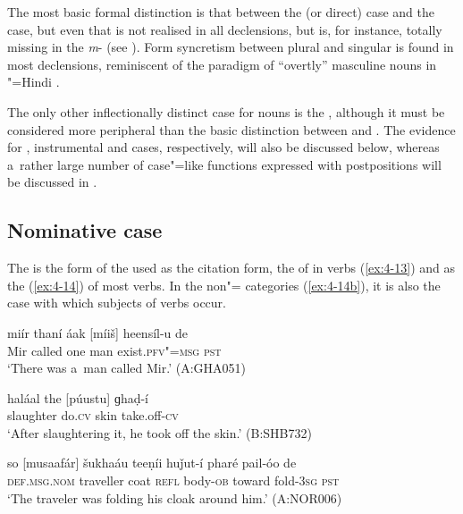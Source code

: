 The most basic formal distinction is that between the  (or direct) case and the  case, but even that is not realised in all declensions, but is, for instance, totally missing in the \textit{m}- (see ). Form syncretism \citep[27]{matthews1991} between  plural and  singular is found in most declensions, reminiscent of the paradigm of ``overtly'' masculine nouns in "=Hindi \citep[1]{schmidt1999}.


The only other inflectionally distinct case for nouns is the , although it must be considered more peripheral than the basic distinction between  and . The evidence for , instrumental and  cases, respectively, will also be discussed below, whereas a~rather large number of case"=like functions expressed with postpositions will be discussed in .


\subsection{Nominative case}
\label{subsec:4-5-1}

The  is the form of the  used as the citation form, the  of in verbs (\ref{ex:4-13}) and as the  (\ref{ex:4-14}) of most  verbs. In the non"= categories (\ref{ex:4-14b}), it is also the case with which subjects of  verbs occur. 


\begin{exe}
\ex
\label{ex:4-13}
\gll miír thaní áak [míiš] heensíl-u de\\
	Mir called one man exist.\textsc{pfv"=msg} \textsc{pst}\\
\glt `There was a~man called Mir.' (A:GHA051)
\end{exe}

\begin{exe}
\ex
\label{ex:4-14}
\gll haláal the [púustu] ɡhaḍ-í \\
	slaughter do.\textsc{cv} skin take.off-\textsc{cv} \\
\glt `After slaughtering it, he took off the skin.' (B:SHB732)
\end{exe}

\begin{exe}
\ex
\label{ex:4-14b}
\gll so [musaafár] šukhaáu teeṇíi huǰut-í pharé pail-óo de \\
	\textsc{def.msg.nom} traveller coat \textsc{refl} body-\textsc{ob} toward fold-\textsc{3sg} \textsc{pst} \\
\glt `The traveler was folding his cloak around him.' (A:NOR006)
\end{exe}


